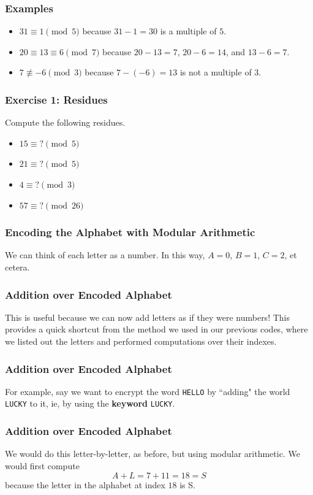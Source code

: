 \documentclass{beamer}
\newcommand{\<}{\langle}
\renewcommand{\>}{\rangle}
\begin{document}
\begin{frame}
\frametitle{Examples}

\begin{itemize}
\item $31 \equiv 1 \pmod 5$ because $31 - 1 = 30$ is a multiple of $5$.
\item $20 \equiv 13 \equiv 6 \pmod 7$ because $20 - 13 = 7$, $20 - 6 = 14$, and $13 - 6 = 7$.
\item $7 \not\equiv -6 \pmod 3$ because $7 - (-6) = 13$ is not a multiple of $3$.
\end{itemize}
\end{frame}
\begin{frame}
\frametitle{Exercise 1: Residues}

Compute the following residues.

\begin{itemize}
\item $15 \equiv ? \pmod 5$
\item $21 \equiv ?\pmod 5$
\item $4 \equiv ?\pmod 3$
\item $57\equiv ? \pmod{26}$
\end{itemize}
\end{frame}


\begin{frame}
\frametitle{Encoding the Alphabet with Modular Arithmetic} 

We can think of each letter as a number. In this way, $A = 0$, $B = 1$, $C = 2$, et cetera. 
\end{frame}

\begin{frame}
\frametitle{Addition over Encoded Alphabet}

This is useful because we can now add letters as if they were numbers! This provides a quick shortcut from the method we used in our previous codes, where we listed out the letters and performed computations over their indexes. 
\end{frame}

\begin{frame}[fragile]
\frametitle{Addition over Encoded Alphabet}

For example, say we want to encrypt the word \verb|HELLO| by ``adding" the world \verb|LUCKY| to it, ie, by using the \textbf{keyword} \verb|LUCKY|.
\end{frame}


\begin{frame}[fragile]
\frametitle{Addition over Encoded Alphabet}

We would do this letter-by-letter, as before, but using modular arithmetic. We would first compute 
\[
A + L = 7 + 11 = 18 = S
\]
because the letter in the alphabet at index $18$ is S.
\end{frame}
\end{document}
